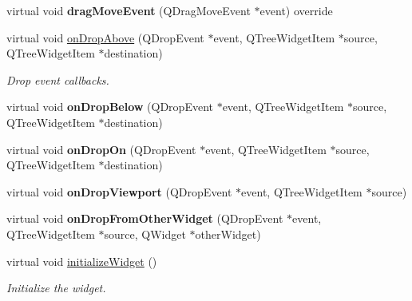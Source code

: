 \begin{Indent}
\begin{DoxyCompactItemize}
virtual void {\bfseries drag\+Move\+Event} (Q\+Drag\+Move\+Event $\ast$event) override
\item 
\mbox{\label{classrev_1_1_view_1_1_tree_widget_ab322fadef1138b34d684d0d7ef78e904}} 
virtual void \mbox{\hyperlink{classrev_1_1_view_1_1_tree_widget_ab322fadef1138b34d684d0d7ef78e904}{on\+Drop\+Above}} (Q\+Drop\+Event $\ast$event, Q\+Tree\+Widget\+Item $\ast$source, Q\+Tree\+Widget\+Item $\ast$destination)
\begin{DoxyCompactList}\small\item\em Drop event callbacks. \end{DoxyCompactList}\item 
\mbox{\label{classrev_1_1_view_1_1_tree_widget_ac8c1e99e7079e3a608a47d5cc99a73d9}} 
virtual void {\bfseries on\+Drop\+Below} (Q\+Drop\+Event $\ast$event, Q\+Tree\+Widget\+Item $\ast$source, Q\+Tree\+Widget\+Item $\ast$destination)
\item 
\mbox{\label{classrev_1_1_view_1_1_tree_widget_a4ca2ab776c7463921e747ece55db7cd2}} 
virtual void {\bfseries on\+Drop\+On} (Q\+Drop\+Event $\ast$event, Q\+Tree\+Widget\+Item $\ast$source, Q\+Tree\+Widget\+Item $\ast$destination)
\item 
\mbox{\label{classrev_1_1_view_1_1_tree_widget_abd93be9e5713d69df7d17bdc3e4c84a3}} 
virtual void {\bfseries on\+Drop\+Viewport} (Q\+Drop\+Event $\ast$event, Q\+Tree\+Widget\+Item $\ast$source)
\item 
\mbox{\label{classrev_1_1_view_1_1_tree_widget_aaf3ed5092fa02ba3522f2df7870a8738}} 
virtual void {\bfseries on\+Drop\+From\+Other\+Widget} (Q\+Drop\+Event $\ast$event, Q\+Tree\+Widget\+Item $\ast$source, Q\+Widget $\ast$other\+Widget)
\item 
\mbox{\label{classrev_1_1_view_1_1_tree_widget_aa2a1f1c59d0a5193e8ec766a31a713a7}} 
virtual void \mbox{\hyperlink{classrev_1_1_view_1_1_tree_widget_aa2a1f1c59d0a5193e8ec766a31a713a7}{initialize\+Widget}} ()
\begin{DoxyCompactList}\small\item\em Initialize the widget. \end{DoxyCompactList}\item 

\end{DoxyCompactItemize}
\end{Indent}
